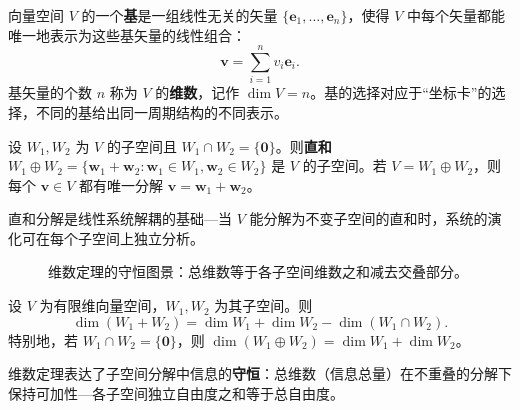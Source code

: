 \begin{definition}[基与维数]\label{def:basis_dimension}
向量空间 $V$ 的一个\textbf{基}是一组线性无关的矢量 $\{\mathbf{e}_1, \dots, \mathbf{e}_n\}$，使得 $V$ 中每个矢量都能唯一地表示为这些基矢量的线性组合：
\[
\mathbf{v} = \sum_{i=1}^n v_i \mathbf{e}_i.
\]
基矢量的个数 $n$ 称为 $V$ 的\textbf{维数}，记作 $\dim V = n$。基的选择对应于“坐标卡”的选择，不同的基给出同一周期结构的不同表示。
\end{definition}

\begin{definition}[直和分解]\label{def:direct_sum}
设 $W_1, W_2$ 为 $V$ 的子空间且 $W_1 \cap W_2 = \{\mathbf{0}\}$。则\textbf{直和} $W_1 \oplus W_2 = \{\mathbf{w}_1 + \mathbf{w}_2 : \mathbf{w}_1 \in W_1, \mathbf{w}_2 \in W_2\}$ 是 $V$ 的子空间。若 $V = W_1 \oplus W_2$，则每个 $\mathbf{v} \in V$ 都有唯一分解 $\mathbf{v} = \mathbf{w}_1 + \mathbf{w}_2$。

直和分解是线性系统解耦的基础---当 $V$ 能分解为不变子空间的直和时，系统的演化可在每个子空间上独立分析。
\end{definition}

\begin{figure}[htbp]
\centering
{}
\caption{维数定理的守恒图景：总维数等于各子空间维数之和减去交叠部分。}
\label{fig:dimension_conservation}
\end{figure}

\begin{theorem}[维数定理与守恒律]\label{thm:dimension_conservation}
设 $V$ 为有限维向量空间，$W_1, W_2$ 为其子空间。则
\[
\dim(W_1 + W_2) = \dim W_1 + \dim W_2 - \dim(W_1 \cap W_2).
\]
特别地，若 $W_1 \cap W_2 = \{\mathbf{0}\}$，则 $\dim(W_1 \oplus W_2) = \dim W_1 + \dim W_2$。

维数定理表达了子空间分解中信息的\textbf{守恒}：总维数（信息总量）在不重叠的分解下保持可加性---各子空间独立自由度之和等于总自由度。
\end{theorem}

